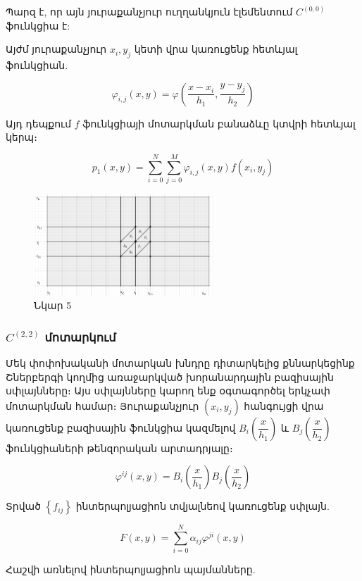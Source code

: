 \documentclass[fleqn, bachelor,subf,12pt,notitlepage]{disser}
\begin{document}
\noindent Պարզ է, որ այն յուրաքանչյուր ուղղանկյուն էլեմենտում $C^{(0, 0)}$ ֆունկցիա է:

\noindent  Այժմ յուրաքանչյուր $x_{i}, y_{j}$ կետի վրա կառուցենք հետևյալ ֆունկցիան.

$$\varphi_{i,j}(x,y)=\varphi \left(\dfrac{x-x_{i}}{h_{1}}, \dfrac{y-y_{j}}{h_{2}}\right)$$

\newpage

Այդ դեպքում $f$ ֆունկցիայի մոտարկման բանաձևը կտվրի հետևյալ կերպ։

$$p_{1}(x,y)=\sum_{i=0}^{N}\sum_{j=0}^{M}\varphi_{i,j}(x,y)f(x_{i}, y_{j})$$

\begin{figure}[h!]
\centering
\includegraphics[width=0.6\textwidth]{images/two_var_courant_3}
\captionsetup{labelformat=empty}
\caption{\hfill Նկար 5}
\end{figure}

\newpage
\subsubsection*{$C^{(2,2)}$ մոտարկում}
Մեկ փոփոխականի մոտարկան խնդրը դիտարկելից քննարկեցինք Շներբերգի կողմից առաջարկված խորանարդային բազիսային սփլայնները։ Այս սփլայնները կարող ենք \newline օգտագործել երկչափ մոտարկման համար։
Յուրաքանչյուր $\left(x_{i}, y_{j}\right)$ հանգույցի վրա կառուցենք բազիսային ֆունկցիա կազմելով $B_{i}\left(\dfrac{x}{h_{1}}\right)$ և $B_{j}\left(\dfrac{x}{h_{2}}\right)$ ֆունկցիաների թենզորական \newline արտադրյալը։

		$$\varphi^{ij}\left(x, y\right) = B_{i}\left(\dfrac{x}{h_{1}}\right) B_{j}\left(\dfrac{x}{h_{2}}\right)$$

\noindent Տրված $\left\{f_{ij}\right\}$ ինտերպոլյացիոն տվյալնեով կառուցենք սփլայն.

				$$ F(x,y) = \sum_{i=0}^{N} \alpha_{ij}\varphi^{ji}\left(x, y\right)$$

\noindent Հաշվի առնելով ինտերպոլյացիոն պայմանները.
\end{document}

